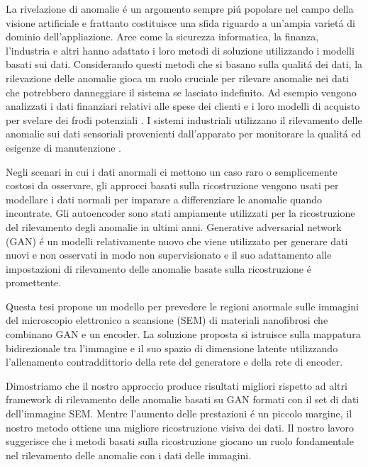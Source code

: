 
\begingroup

La rivelazione di anomalie \'e un argomento sempre pi\'u popolare nel campo della visione artificiale e 
frattanto costituisce una sfida riguardo a un'ampia variet\'a di dominio dell'appliazione. 
Aree come la sicurezza informatica, la finanza, l'industria e altri hanno adattato i loro metodi di 
soluzione utilizzando i modelli basati sui dati. 
Considerando questi metodi che si basano sulla qualit\'a dei dati, la rilevazione delle anomalie gioca 
un ruolo cruciale per rilevare anomalie nei dati che potrebbero danneggiare il sistema se lasciato indefinito. 
Ad esempio vengono analizzati i dati finanziari relativi alle spese dei clienti e i loro modelli 
di acquisto per svelare dei frodi potenziali \cite{finance_anomaly}. 
I sistemi industriali utilizzano il rilevamento delle anomalie sui dati sensoriali provenienti dall'apparato 
per monitorare la qualit\'a ed esigenze di manutenzione \cite{inproceedings_industry}.

Negli scenari in cui i dati anormali ci mettono un caso raro o semplicemente costosi da osservare, 
gli approcci basati sulla ricostruzione vengono usati per modellare i dati normali per imparare a 
differenziare le anomalie quando incontrate. 
Gli autoencoder sono stati ampiamente utilizzati per la ricostruzione del rilevamento degli anomalie 
in ultimi anni. Generative adversarial network (GAN) \'e un modelli relativamente nuovo che viene utilizzato 
per generare dati nuovi e non osservati in modo non supervisionato e il suo adattamento alle 
impostazioni di rilevamento delle anomalie basate sulla ricostruzione \'e promettente.


Questa tesi propone un modello per prevedere le regioni anormale sulle immagini del microscopio 
elettronico a scansione (SEM) di materiali nanofibrosi che combinano GAN e un encoder. 
La soluzione proposta si istruisce sulla mappatura bidirezionale tra l’immagine e il 
suo spazio di dimensione latente utilizzando l’allenamento contraddittorio della rete 
del generatore e della rete di encoder.

Dimostriamo che il nostro approccio produce risultati migliori rispetto ad altri 
framework di rilevamento delle anomalie basati su GAN formati con il set di dati dell'immagine SEM. 
Mentre l'aumento delle prestazioni \'e un piccolo margine, il nostro metodo ottiene una 
migliore ricostruzione visiva dei dati.
Il nostro lavoro suggerisce che i metodi basati sulla ricostruzione giocano un ruolo fondamentale 
nel rilevamento delle anomalie con i dati delle immagini.


\endgroup